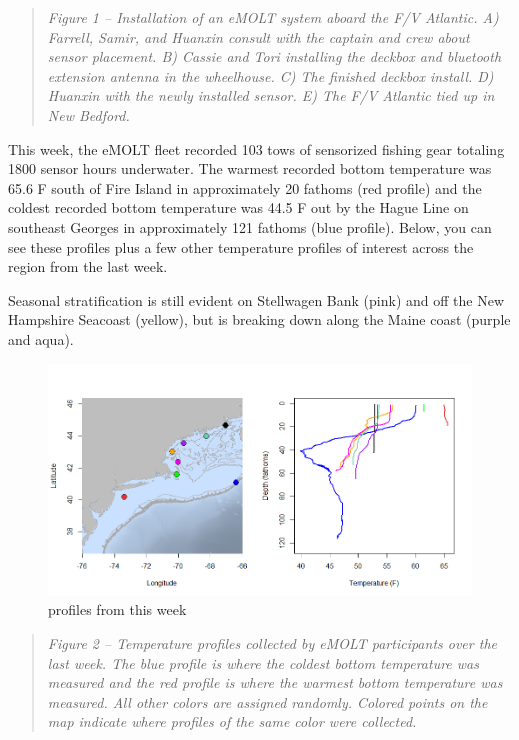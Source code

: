 \documentclass[
]{article}
\begin{document}
\begin{quote}
\emph{Figure 1 -- Installation of an eMOLT system aboard the F/V
Atlantic. A) Farrell, Samir, and Huanxin consult with the captain and
crew about sensor placement. B) Cassie and Tori installing the deckbox
and bluetooth extension antenna in the wheelhouse. C) The finished
deckbox install. D) Huanxin with the newly installed sensor. E) The F/V
Atlantic tied up in New Bedford.}
\end{quote}

This week, the eMOLT fleet recorded 103 tows of sensorized fishing gear
totaling 1800 sensor hours underwater. The warmest recorded bottom
temperature was 65.6 F south of Fire Island in approximately 20 fathoms
(red profile) and the coldest recorded bottom temperature was 44.5 F out
by the Hague Line on southeast Georges in approximately 121 fathoms
(blue profile). Below, you can see these profiles plus a few other
temperature profiles of interest across the region from the last week.

Seasonal stratification is still evident on Stellwagen Bank (pink) and
off the New Hampshire Seacoast (yellow), but is breaking down along the
Maine coast (purple and aqua).

\begin{figure}
\centering
\includegraphics{profiles.png}
\caption{profiles from this week}
\end{figure}

\begin{quote}
\emph{Figure 2 -- Temperature profiles collected by eMOLT participants
over the last week. The blue profile is where the coldest bottom
temperature was measured and the red profile is where the warmest bottom
temperature was measured. All other colors are assigned randomly.
Colored points on the map indicate where profiles of the same color were
collected.}
\end{quote}
\end{document}
